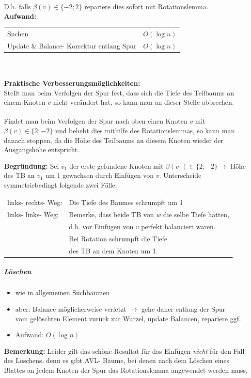 \documentclass[fleqn]{scrartcl}
\begin{document}
D.h. falls $\beta(v) \in \{-2; 2\}$ repariere dies sofort mit Rotationslemma.\\

\textbf{Aufwand:}
\begin{tabular} {l l}
Suchen & $O(\log n)$\\
Update \& Balance- Korrektur entlang Spur & $O (\log n)$
\end{tabular}\\\\
\textbf{Praktische Verbesserungsmöglichkeiten:}\\
Stellt man beim Verfolgen der Spur fest, dass sich die Tiefe des Teilbaums an einem Knoten $v$ nicht verändert hat, so kann man an dieser Stelle abbrechen.\\\\
Findet man beim Verfolgen der Spur nach oben einen Knoten $v$ mit $\beta(v) \in \{2; -2\}$ und behebt dies mithilfe des Rotationslemmas, so kann man danach stoppen, da die Höhe des Teilbaums an diesem Knoten wieder der Ausgangshöhe entspricht.

\textbf{Begründung:} Sei $v_1$ der erste gefundene Knoten mit $\beta(v_1) \in \{2; -2\} \rightarrow$ Höhe des TB an $v_1$ um 1 gewachsen durch Einfügen von $v$. Unterscheide symmetriebedingt folgende zwei Fälle:\\

\begin{tabular} {l l}
links- rechts- Weg: & Die Tiefe des Baumes schrumpft um 1 \\
links- links- Weg: & Bemerke, dass beide TB von $w$ die selbe Tiefe hatten,\\ & d.h. vor Einfügen von $v$ perfekt balanciert waren. \\ & Bei Rotation schrumpft die Tiefe \\& des TB an dem Knoten um 1.
\end{tabular}

\newpage
\subparagraph{Löschen}
\begin{itemize}
\item wie in allgemeinen Suchbäumen
\item aber: Balance möglicherweise verletzt $\rightarrow$ gehe daher entlang der Spur \\vom gelöschten Element zurück zur Wurzel, update Balancen, repariere ggf.
\item Aufwand: $O(\log n)$
\end{itemize}

\textbf{Bemerkung:} Leider gilt das schöne Resultat für das Einfügen \textit{nicht} für den Fall des Löschens, denn es gibt AVL- Bäume, bei denen nach dem Löschen eines Blattes an jedem Knoten der Spur das Rotationslemma angewendet werden muss.
\end{document}
